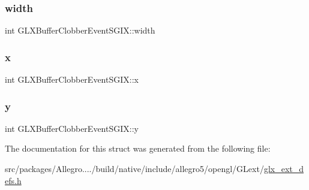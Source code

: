 \subsubsection{\texorpdfstring{width}{width}}
{\footnotesize\ttfamily int G\+L\+X\+Buffer\+Clobber\+Event\+S\+G\+I\+X\+::width}

\mbox{\label{struct_g_l_x_buffer_clobber_event_s_g_i_x_a5118d48c3c8d5253d39922b5014b52ff}} 
\subsubsection{\texorpdfstring{x}{x}}
{\footnotesize\ttfamily int G\+L\+X\+Buffer\+Clobber\+Event\+S\+G\+I\+X\+::x}

\mbox{\label{struct_g_l_x_buffer_clobber_event_s_g_i_x_aef21efa11558a5b67861f96471c56003}} 
\subsubsection{\texorpdfstring{y}{y}}
{\footnotesize\ttfamily int G\+L\+X\+Buffer\+Clobber\+Event\+S\+G\+I\+X\+::y}



The documentation for this struct was generated from the following file\+:\begin{DoxyCompactItemize}
\item 
src/packages/\+Allegro..../build/native/include/allegro5/opengl/\+G\+Lext/\hyperlink{glx__ext__defs_8h}{glx\+\_\+ext\+\_\+defs.\+h}\end{DoxyCompactItemize}
